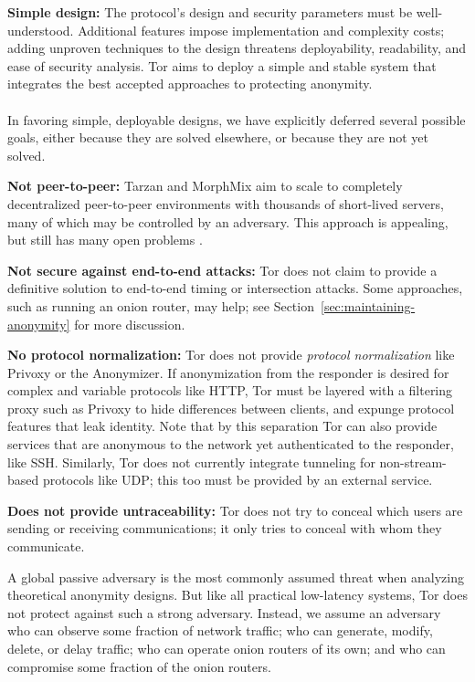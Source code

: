 \documentclass[times,10pt,twocolumn]{article}
\begin{document}
\textbf{Simple design:} The protocol's design and security
parameters must be well-understood. Additional features impose implementation
and complexity costs; adding unproven techniques to the design threatens
deployability, readability, and ease of security analysis. Tor aims to
deploy a simple and stable system that integrates the best accepted
approaches to protecting anonymity.\\

\label{subsec:non-goals}\\
In favoring simple, deployable designs, we have explicitly deferred
several possible goals, either because they are solved elsewhere, or because
they are not yet solved.

\textbf{Not peer-to-peer:} Tarzan and MorphMix aim to scale to completely
decentralized peer-to-peer environments with thousands of short-lived
servers, many of which may be controlled by an adversary.  This approach
is appealing, but still has many open problems
\cite{tarzan:ccs02,morphmix:fc04}.

\textbf{Not secure against end-to-end attacks:} Tor does not claim
to provide a definitive solution to end-to-end timing or intersection
attacks. Some approaches, such as running an onion router, may help;
see Section~\ref{sec:maintaining-anonymity} for more discussion.

\textbf{No protocol normalization:} Tor does not provide \emph{protocol
normalization} like Privoxy or the Anonymizer. If anonymization from
the responder is desired for complex and variable
protocols like HTTP, Tor must be layered with a filtering proxy such
as Privoxy to hide differences between clients, and expunge protocol
features that leak identity. 
Note that by this separation Tor can also provide services that
are anonymous to the network yet authenticated to the responder, like
SSH.
Similarly, Tor does not currently integrate
tunneling for non-stream-based protocols like UDP; this too must be
provided by an external service.

\textbf{Does not provide untraceability:} Tor does not try to conceal
which users are
sending or receiving communications; it only tries to conceal with whom
they communicate.

\label{subsec:threat-model}

A global passive adversary is the most commonly assumed threat when
analyzing theoretical anonymity designs. But like all practical
low-latency systems, Tor does not protect against such a strong
adversary. Instead, we assume an adversary who can observe some fraction
of network traffic; who can generate, modify, delete, or delay
traffic;  who can operate onion routers of its own; and who can
compromise some fraction of the onion routers.
\end{document}
